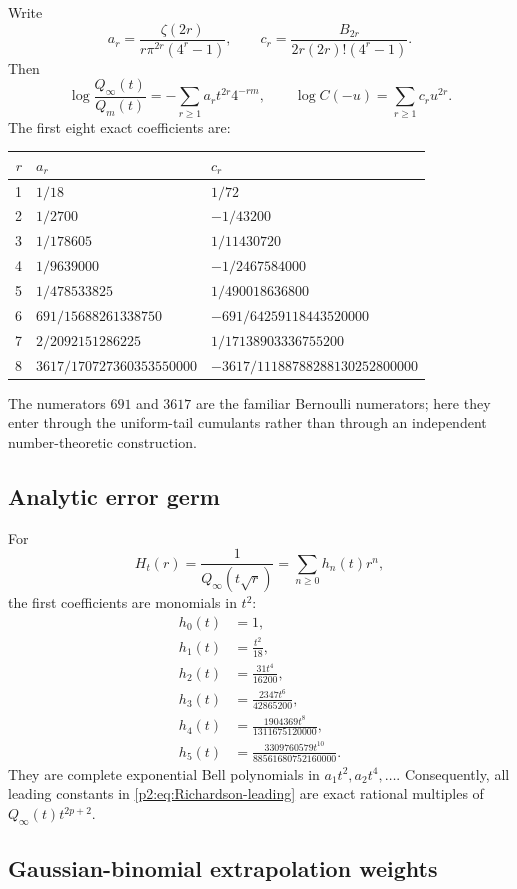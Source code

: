 \documentclass[11pt,oneside]{article}
\numberwithin{equation}{section}
\theoremstyle{definition}
\theoremstyle{remark}
\begin{document}
Write
\[
 a_r=\frac{\zeta(2r)}{r\pi^{2r}(4^r-1)},
 \qquad
 c_r=\frac{B_{2r}}{2r(2r)!(4^r-1)}.
\]
Then
\[
 \log\frac{Q_\infty(t)}{Q_m(t)}=-\sum_{r\ge1}a_rt^{2r}4^{-rm},
 \qquad
 \log C(-u)=\sum_{r\ge1}c_ru^{2r}.
\]
The first eight exact coefficients are:
\begin{center}
\small
\begin{tabular}{@{}rll@{}}
\toprule
$r$ & $a_r$ & $c_r$\\
\midrule
1 & $1/18$ & $1/72$\\
2 & $1/2700$ & $-1/43200$\\
3 & $1/178605$ & $1/11430720$\\
4 & $1/9639000$ & $-1/2467584000$\\
5 & $1/478533825$ & $1/490018636800$\\
6 & $691/15688261338750$ & $-691/64259118443520000$\\
7 & $2/2092151286225$ & $1/17138903336755200$\\
8 & $3617/170727360353550000$ & $-3617/11188788288130252800000$\\
\bottomrule
\end{tabular}
\end{center}
The numerators $691$ and $3617$ are the familiar Bernoulli numerators; here they enter through
the uniform-tail cumulants rather than through an independent number-theoretic construction.

\subsection{Analytic error germ}

For
\[
 H_t(r)=\frac1{Q_\infty(t\sqrt r)}=\sum_{n\ge0}h_n(t)r^n,
\]
the first coefficients are monomials in $t^2$:
\begin{align*}
 h_0(t)&=1,\\
 h_1(t)&=\frac{t^2}{18},\\
 h_2(t)&=\frac{31t^4}{16200},\\
 h_3(t)&=\frac{2347t^6}{42865200},\\
 h_4(t)&=\frac{1904369t^8}{1311675120000},\\
 h_5(t)&=\frac{3309760579t^{10}}{88561680752160000}.
\end{align*}
They are complete exponential Bell polynomials in $a_1t^2,a_2t^4,\ldots$.  Consequently,
all leading constants in \eqref{p2:eq:Richardson-leading} are exact rational multiples of
$Q_\infty(t)t^{2p+2}$.

\subsection{Gaussian-binomial extrapolation weights}
\end{document}
